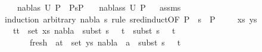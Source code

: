 \begin{isabellebody}
\ \ \ {\isachardoublequoteopen}{\isacharparenleft}{\kern0pt}nabla{}{\isacharcomma}{\kern0pt}s{}{\isacharparenright}{\kern0pt}{\isasymin}\ U\ P{}{\isachardoublequoteclose}\ \ {\isachardoublequoteopen}P{}{\isasymturnstile}s{}{\isasymleadsto}P{}{\isachardoublequoteclose}\isanewline
\ \ \ {\isachardoublequoteopen}{\isacharparenleft}{\kern0pt}nabla{}{\isacharcomma}{\kern0pt}s{}{\isasymbullet}s{}{\isacharparenright}{\kern0pt}{\isasymin}\ U\ P{}{\isachardoublequoteclose}\isanewline
%
\isadelimproof
\ %
\endisadelimproof
%
\isatagproof
{}\isamarkupfalse%
\ assms\isanewline
{}\isamarkupfalse%
{\isacharparenleft}{\kern0pt}induction\ arbitrary{\isacharcolon}{\kern0pt}\ nabla{}\ s{}\ rule{\isacharcolon}{\kern0pt}\ s{\isacharunderscore}{\kern0pt}red{\isachardot}{\kern0pt}induct{\isacharbrackleft}{\kern0pt}OF\ {\isacartoucheopen}P{}\ {\isasymturnstile}\ s{}\ {\isasymleadsto}\ P{}{\isacartoucheclose}{\isacharbrackright}{\kern0pt}{\isacharparenright}{\kern0pt}\isanewline
\ \ \isamarkupfalse%
\ {\isacharparenleft}{\kern0pt}{}\ xs\ ys{\isacharparenright}{\kern0pt}\isanewline
\ \ \isamarkupfalse%
\ {\isachardoublequoteopen}{\isasymforall}\ {\isacharparenleft}{\kern0pt}t{}{\isacharcomma}{\kern0pt}t{}{\isacharparenright}{\kern0pt}\ {\isasymin}\ set\ xs{\isachardot}{\kern0pt}\ nabla{}\ {\isasymturnstile}\ subst\ {\isacharparenleft}{\kern0pt}s{}\ {\isasymbullet}\ {\isacharbrackleft}{\kern0pt}{\isacharbrackright}{\kern0pt}{\isacharparenright}{\kern0pt}\ t{}\ {\isasymapprox}\ subst\ {\isacharparenleft}{\kern0pt}s{}\ {\isasymbullet}\ {\isacharbrackleft}{\kern0pt}{\isacharbrackright}{\kern0pt}{\isacharparenright}{\kern0pt}\ t{}{\isachardoublequoteclose}\ \isanewline
\ \ \ \ \ \ fresh{\isacharcolon}{\kern0pt}\ {\isachardoublequoteopen}{\isasymforall}\ {\isacharparenleft}{\kern0pt}a{\isacharcomma}{\kern0pt}t{\isacharparenright}{\kern0pt}\ {\isasymin}\ set\ ys{\isachardot}{\kern0pt}\ nabla{}\ {\isasymturnstile}\ a\ {\isasymsharp}\ subst\ {\isacharparenleft}{\kern0pt}s{}\ {\isasymbullet}\ {\isacharbrackleft}{\kern0pt}{\isacharbrackright}{\kern0pt}{\isacharparenright}{\kern0pt}\ t{\isachardoublequoteclose}\isanewline
\ \ \ \ \isamarkupfalse%

\end{isabellebody}
